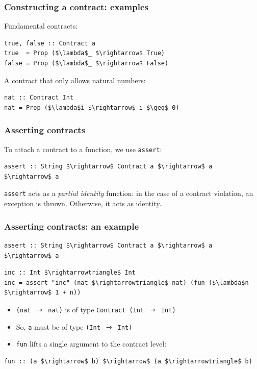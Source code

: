 \documentclass[]{beamer}
\begin{document}
\begin{frame}[fragile]
\frametitle{Constructing a contract: examples}

Fundamental contracts:

\begin{lstlisting}[mathescape]
true, false :: Contract a
true  = Prop ($\lambda$_ $\rightarrow$ True)
false = Prop ($\lambda$_ $\rightarrow$ False)
\end{lstlisting}

A contract that only allows natural numbers:

\begin{lstlisting}[mathescape]
nat :: Contract Int
nat = Prop ($\lambda$i $\rightarrow$ i $\geq$ 0)
\end{lstlisting}

\end{frame}

\begin{frame}[fragile]
\frametitle{Asserting contracts}

To attach a contract to a function, we use \texttt{assert}:

\begin{lstlisting}[mathescape]
assert :: String $\rightarrow$ Contract a $\rightarrow$ a $\rightarrow$ a
\end{lstlisting}

\texttt{assert} acts as a \emph{partial identity} function: in the case of a contract violation, an exception is thrown. Otherwise, it acts as identity.

\end{frame}

\begin{frame}[fragile]
\frametitle{Asserting contracts: an example}

\begin{lstlisting}[mathescape]
assert :: String $\rightarrow$ Contract a $\rightarrow$ a $\rightarrow$ a
\end{lstlisting}

\begin{lstlisting}[mathescape]
inc :: Int $\rightarrowtriangle$ Int
inc = assert "inc" (nat $\rightarrowtriangle$ nat) (fun ($\lambda$n $\rightarrow$ 1 + n))
\end{lstlisting}

\begin{itemize}
	\item \texttt{(nat $\rightarrowtriangle$ nat)} is of type \texttt{Contract (Int $\rightarrowtriangle$ Int)}
	\item So, \texttt{a} must be of type \texttt{(Int $\rightarrowtriangle$ Int)}
	\item \texttt{fun} lifts a single argument to the contract level:
\end{itemize}

\begin{lstlisting}[mathescape]
fun :: (a $\rightarrow$ b) $\rightarrow$ (a $\rightarrowtriangle$ b)
\end{lstlisting}

\end{frame}
\end{document}
